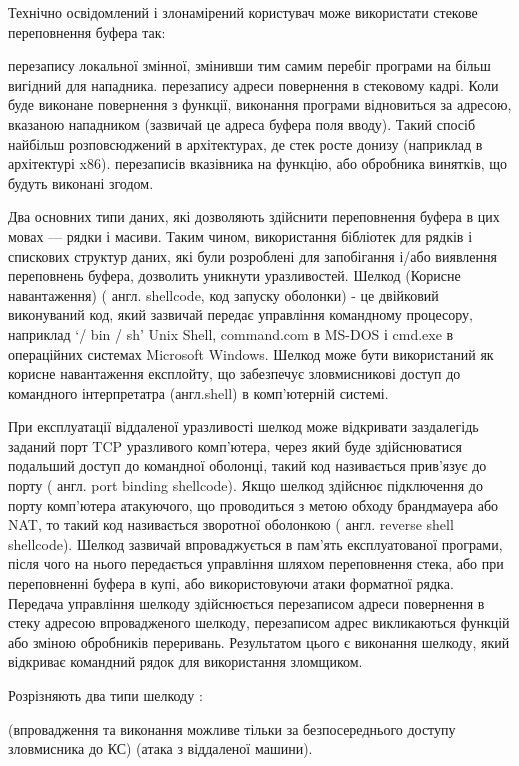 Технічно освідомлений і злонамірений користувач може використати стекове переповнення буфера так:
\begin{enumerate}
 перезапису локальної змінної, змінивши тим самим перебіг програми на більш вигідний для нападника.
 перезапису адреси повернення в стековому кадрі. Коли буде виконане повернення з функції, виконання програми відновиться за адресою, вказаною нападником (зазвичай це адреса буфера поля вводу). Такий спосіб найбільш розповсюджений в архітектурах, де стек росте донизу (наприклад в архітектурі x86).
 перезаписів вказівника на функцію, або обробника винятків, що будуть виконані згодом. 
\end{enumerate}

Два основних типи даних, які дозволяють здійснити переповнення буфера в цих мовах — рядки і масиви. Таким чином, використання бібліотек для рядків і спискових структур даних, які були розроблені для запобігання і/або виявлення переповнень буфера, дозволить уникнути уразливостей.
Шелкод (Корисне навантаження) ( англ. shellcode, код запуску оболонки) - це двійковий виконуваний код, який зазвичай передає управління командному процесору,  наприклад `/ bin / sh'  Unix Shell, command.com в MS-DOS і cmd.exe в операційних системах Microsoft Windows.  Шелкод може бути використаний як корисне навантаження експлойту, що забезпечує зловмисникові доступ до командного інтерпретатра (англ.shell) в комп'ютерній системі.

При експлуатації віддаленої уразливості шелкод може відкривати заздалегідь заданий порт TCP уразливого комп'ютера, через який буде здійснюватися подальший доступ до командної оболонці, такий код називається прив'язує до порту ( англ. port binding shellcode).  Якщо шелкод здійснює підключення до порту комп'ютера атакуючого, що проводиться з метою обходу брандмауера або NAT, то такий код називається зворотної оболонкою ( англ. reverse shell shellcode).
Шелкод зазвичай впроваджується в пам'ять експлуатованої програми, після чого на нього передається управління шляхом переповнення стека, або при переповненні буфера в купі, або використовуючи атаки форматної рядка.  Передача управління шелкоду здійснюється перезаписом адреси повернення в стеку адресою впровадженого шелкоду, перезаписом адрес викликаються функцій або зміною обробників переривань.  Результатом цього є виконання шелкоду, який відкриває командний рядок для використання зломщиком.

Розрізняють два типи шелкоду :
\begin{itemize}
 (впровадження та виконання можливе тільки за безпосереднього доступу зловмисника до КС)
 (атака з віддаленої машини). 
\end{itemize}

